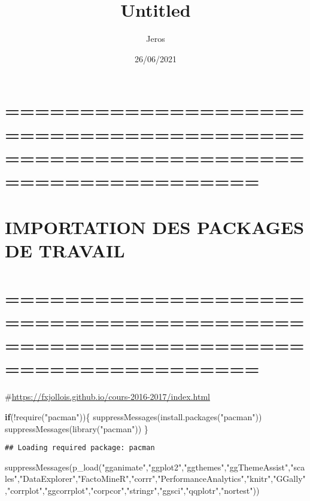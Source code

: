 \documentclass[
]{article}
\title{Untitled}
\author{Jeros}
\date{26/06/2021}
\newenvironment{Shaded}{\begin{snugshade}}{\end{snugshade}}
\newcommand{\ControlFlowTok}[1]{\textcolor[rgb]{0.13,0.29,0.53}{\textbf{#1}}}
\newcommand{\FunctionTok}[1]{\textcolor[rgb]{0.00,0.00,0.00}{#1}}
\newcommand{\NormalTok}[1]{#1}
\newcommand{\SpecialCharTok}[1]{\textcolor[rgb]{0.00,0.00,0.00}{#1}}
\newcommand{\StringTok}[1]{\textcolor[rgb]{0.31,0.60,0.02}{#1}}
\begin{document}
\maketitle

\hypertarget{section}{%
\section{=============================================================================}\label{section}}

\hypertarget{importation-des-packages-de-travail}{%
\section{IMPORTATION DES PACKAGES DE
TRAVAIL}\label{importation-des-packages-de-travail}}

\hypertarget{section-1}{%
\section{=============================================================================}\label{section-1}}

\#\url{https://fxjollois.github.io/cours-2016-2017/index.html}

\begin{Shaded}
\begin{Highlighting}[]
\ControlFlowTok{if}\NormalTok{(}\SpecialCharTok{!}\FunctionTok{require}\NormalTok{(}\StringTok{"pacman"}\NormalTok{))\{}
    \FunctionTok{suppressMessages}\NormalTok{(}\FunctionTok{install.packages}\NormalTok{(}\StringTok{"pacman"}\NormalTok{))}
    \FunctionTok{suppressMessages}\NormalTok{(}\FunctionTok{library}\NormalTok{(}\StringTok{"pacman"}\NormalTok{))}
\NormalTok{\} }
\end{Highlighting}
\end{Shaded}

\begin{verbatim}
## Loading required package: pacman
\end{verbatim}

\begin{Shaded}
\begin{Highlighting}[]
 \FunctionTok{suppressMessages}\NormalTok{(}\FunctionTok{p\_load}\NormalTok{(}\StringTok{"gganimate"}\NormalTok{,}\StringTok{"ggplot2"}\NormalTok{,}\StringTok{"ggthemes"}\NormalTok{,}\StringTok{"ggThemeAssist"}\NormalTok{,}\StringTok{"scales"}\NormalTok{,}\StringTok{"DataExplorer"}\NormalTok{,}\StringTok{"FactoMineR"}\NormalTok{,}\StringTok{"corrr"}\NormalTok{,}\StringTok{"PerformanceAnalytics"}\NormalTok{,}\StringTok{"knitr"}\NormalTok{,}\StringTok{"GGally"}\NormalTok{,}\StringTok{"corrplot"}\NormalTok{,}\StringTok{"ggcorrplot"}\NormalTok{,}\StringTok{"corpcor"}\NormalTok{,}\StringTok{"stringr"}\NormalTok{,}\StringTok{"ggsci"}\NormalTok{,}\StringTok{"qqplotr"}\NormalTok{,}\StringTok{"nortest"}\NormalTok{))}
\end{Highlighting}
\end{Shaded}
\end{document}
